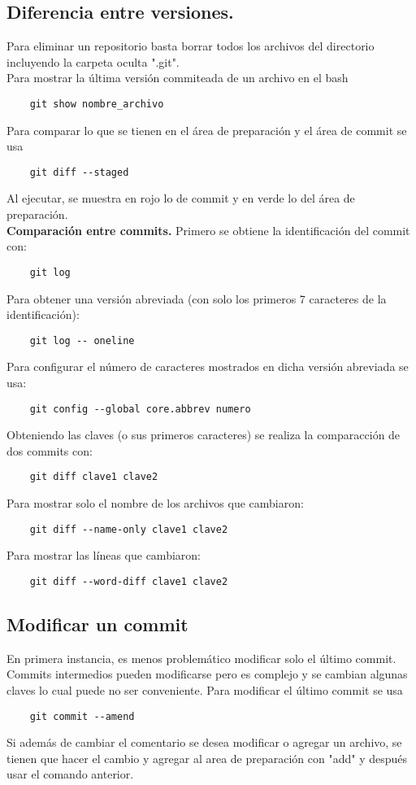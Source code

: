 \documentclass[10pt,oneside]{article}
\begin{document}
\begin{multicols}{2}
\subsection{Diferencia entre versiones.} 
Para eliminar un repositorio basta borrar todos los archivos del directorio incluyendo la carpeta oculta ".git". \\ \newline Para mostrar la última versión commiteada de un archivo en el bash \begin{verbatim}
    git show nombre_archivo
\end{verbatim}
Para comparar lo que se tienen en el área de preparación y el área de commit se usa \begin{verbatim}
    git diff --staged
\end{verbatim}
Al ejecutar, se muestra en rojo lo de commit y en verde lo del área de preparación.\\ \newline \textbf{Comparación entre commits.} Primero se obtiene la identificación del commit con:\begin{verbatim}
    git log
\end{verbatim}
Para obtener una versión abreviada (con solo los primeros 7 caracteres de la identificación):
\begin{verbatim}
    git log -- oneline
\end{verbatim}
Para configurar el número de caracteres mostrados en dicha versión abreviada se usa: \begin{verbatim}
    git config --global core.abbrev numero
\end{verbatim}
Obteniendo las claves (o sus primeros caracteres) se realiza la comparacción de dos commits con:
\begin{verbatim}
    git diff clave1 clave2
\end{verbatim}
Para mostrar solo el nombre de los archivos que cambiaron:
\begin{verbatim}
    git diff --name-only clave1 clave2 
\end{verbatim}
Para mostrar las líneas que cambiaron:
\begin{verbatim}
    git diff --word-diff clave1 clave2 
\end{verbatim}
\subsection{Modificar un commit} En primera instancia, es menos problemático modificar solo el último commit. Commits intermedios pueden modificarse pero es complejo y se cambian algunas claves lo cual puede no ser conveniente. Para modificar el último commit se usa
\begin{verbatim}
    git commit --amend
\end{verbatim}
Si además de cambiar el comentario se desea modificar o agregar un archivo, se tienen que hacer el cambio y agregar al area de preparación con "add" y después usar el comando anterior. 

\end{multicols}
\end{document}
